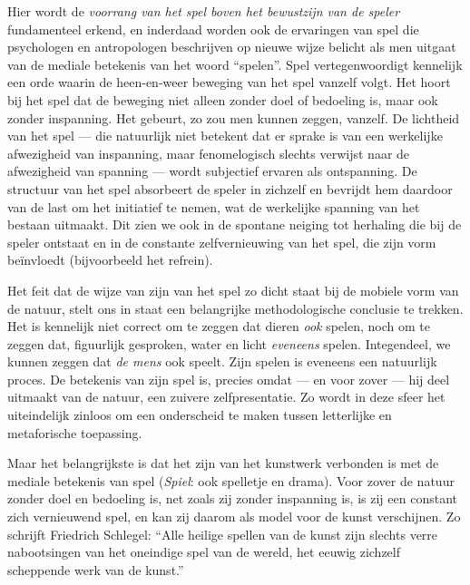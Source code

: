 Hier wordt de \textit{voorrang van het spel boven het bewustzijn van de speler} fundamenteel erkend, en inderdaad worden ook de ervaringen van spel die psychologen en antropologen beschrijven op nieuwe wijze belicht als men uitgaat van de mediale betekenis van het woord ``spelen''. Spel vertegenwoordigt kennelijk een orde waarin de heen-en-weer beweging van het spel vanzelf volgt. Het hoort bij het spel dat de beweging niet alleen zonder doel of bedoeling is, maar ook zonder inspanning. Het gebeurt, zo zou men kunnen zeggen, vanzelf. De lichtheid van het spel — die natuurlijk niet betekent dat er sprake is van een werkelijke afwezigheid van inspanning, maar fenomelogisch slechts verwijst naar de afwezigheid van spanning — wordt subjectief ervaren als ontspanning. De structuur van het spel absorbeert de speler in zichzelf en bevrijdt hem daardoor van de last om het initiatief te nemen, wat de werkelijke spanning van het bestaan uitmaakt. Dit zien we ook in de spontane neiging tot herhaling die bij de speler ontstaat en in de constante zelfvernieuwing van het spel, die zijn vorm beïnvloedt (bijvoorbeeld het refrein).

Het feit dat de wijze van zijn van het spel zo dicht staat bij de mobiele vorm van de natuur, stelt ons in staat een belangrijke methodologische conclusie te trekken. Het is kennelijk niet correct om te zeggen dat dieren \textit{ook} spelen, noch om te zeggen dat, figuurlijk gesproken, water en licht \textit{eveneens} spelen. Integendeel, we kunnen zeggen dat \textit{de mens} ook speelt. Zijn spelen is eveneens een natuurlijk proces. De betekenis van zijn spel is, precies omdat — en voor zover — hij deel uitmaakt van de natuur, een zuivere zelfpresentatie. Zo wordt in deze sfeer het uiteindelijk zinloos om een onderscheid te maken tussen letterlijke en metaforische toepassing.

Maar het belangrijkste is dat het zijn van het kunstwerk verbonden is met de mediale betekenis van spel (\textit{Spiel}: ook spelletje en drama). Voor zover de natuur zonder doel en bedoeling is, net zoals zij zonder inspanning is, is zij een constant zich vernieuwend spel, en kan zij daarom als model voor de kunst verschijnen. Zo schrijft Friedrich Schlegel: ``Alle heilige spellen van de kunst zijn slechts verre nabootsingen van het oneindige spel van de wereld, het eeuwig zichzelf scheppende werk van de kunst.''


